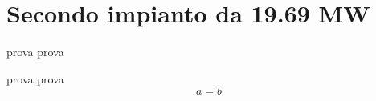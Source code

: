 \section{Secondo impianto da 19.69 MW}
prova 
prova 

prova prova
\begin{equation}
a = b
\end{equation}
